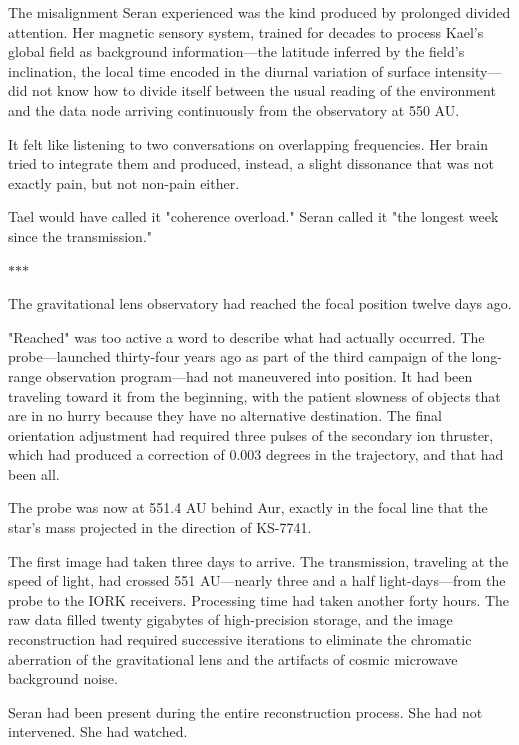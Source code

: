 \documentclass[11pt,a5paper,twoside]{book}
\begin{document}
The misalignment Seran experienced was the kind produced by prolonged divided attention. Her magnetic sensory system, trained for decades to process Kael's global field as background information—the latitude inferred by the field's inclination, the local time encoded in the diurnal variation of surface intensity—did not know how to divide itself between the usual reading of the environment and the data node arriving continuously from the observatory at 550 AU.

It felt like listening to two conversations on overlapping frequencies. Her brain tried to integrate them and produced, instead, a slight dissonance that was not exactly pain, but not non-pain either.

Tael would have called it "coherence overload." Seran called it "the longest week since the transmission."

\vspace{1.5em}
\begin{center}$\ast$\quad$\ast$\quad$\ast$\end{center}
\vspace{1.5em}

The gravitational lens observatory had reached the focal position twelve days ago.

"Reached" was too active a word to describe what had actually occurred. The probe—launched thirty-four years ago as part of the third campaign of the long-range observation program—had not maneuvered into position. It had been traveling toward it from the beginning, with the patient slowness of objects that are in no hurry because they have no alternative destination. The final orientation adjustment had required three pulses of the secondary ion thruster, which had produced a correction of 0.003 degrees in the trajectory, and that had been all.

The probe was now at 551.4 AU behind Aur, exactly in the focal line that the star's mass projected in the direction of KS-7741.

The first image had taken three days to arrive. The transmission, traveling at the speed of light, had crossed 551 AU—nearly three and a half light-days—from the probe to the IORK receivers. Processing time had taken another forty hours. The raw data filled twenty gigabytes of high-precision storage, and the image reconstruction had required successive iterations to eliminate the chromatic aberration of the gravitational lens and the artifacts of cosmic microwave background noise.

Seran had been present during the entire reconstruction process. She had not intervened. She had watched.
\end{document}
